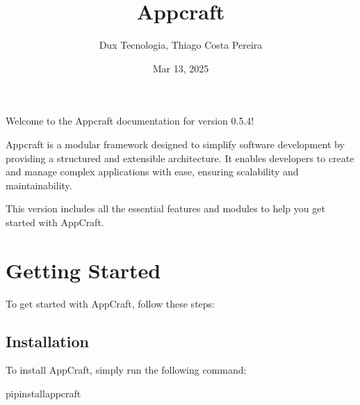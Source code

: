 \documentclass[letterpaper,10pt,english]{sphinxhowto}
\title{Appcraft}
\date{Mar 13, 2025}
\author{Dux Tecnologia, Thiago Costa Pereira}
\let\sphinxpxdimen\pdfpxdimen\else\newdimen\sphinxpxdimen
\begin{document}
\pagestyle{empty}
\sphinxmaketitle
\pagestyle{plain}
\sphinxtableofcontents
\pagestyle{normal}
\label{\detokenize{index::doc}}


\noindent\sphinxincludegraphics[width=200\sphinxpxdimen,height=200\sphinxpxdimen]{{logo}.png}

\sphinxAtStartPar
Welcome to the Appcraft documentation for version 0.5.4!

\sphinxAtStartPar
Appcraft is a modular framework designed to simplify software development by providing a structured and extensible architecture. It enables developers to create and manage complex applications with ease, ensuring scalability and maintainability.

\sphinxAtStartPar
This version includes all the essential features and modules to help you get started with AppCraft.

\sphinxstepscope


\section{Getting Started}
\label{\detokenize{getting_started:getting-started}}\label{\detokenize{getting_started::doc}}
\sphinxAtStartPar
To get started with AppCraft, follow these steps:


\subsection{Installation}
\label{\detokenize{getting_started:installation}}
\sphinxAtStartPar
To install AppCraft, simply run the following command:

\begin{sphinxVerbatim}[commandchars=\\\{\}]
pipinstallappcraft
\end{sphinxVerbatim}
\end{document}
